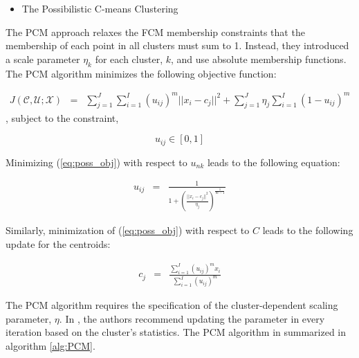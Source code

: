 \documentclass[12pt,dvips]{report}
\numberwithin{equation}{section}
\begin{document}
\begin{itemize}[leftmargin=12 pt]
\item The Possibilistic C-means Clustering
\end{itemize}

The PCM approach \cite{PCM} relaxes the FCM membership constraints that the membership of each point in all clusters must sum to 1.  Instead, they introduced a scale parameter $\eta_{k}$ for each cluster, $k$, and use absolute membership functions.  The PCM algorithm minimizes the following objective function:

\begin{eqnarray}  \label{eq:poss_obj}
J(\mathcal{C}, \mathcal{U};\mathcal{X})  & = & \sum_{j=1}^{J}\sum_{i=1}^{I} (u_{ij})^{m} \vert \vert x_{i}-c_{j}\vert \vert ^{2}+  \sum_{j=1}^{J}\eta_{j}\sum_{i=1}^{I}(1-u_{ij})^{m}
\end{eqnarray}, subject to the constraint,

\begin{equation} \label{eq:poss_con}
u_{ij}\in [0,1]
\end{equation}

Minimizing (\ref{eq:poss_obj}) with respect to $u_{nk}$ leads to the following equation:

\begin{eqnarray}  \label{eq:poss_optmu}
u_{ij}  & = & \frac{1}{1+(\frac{\vert \vert x_{i}-c_{j}\vert \vert ^{2}}{\eta_{j}})^{\frac{1}{m-1}}}
\end{eqnarray}

Similarly, minimization of (\ref{eq:poss_obj}) with respect to $C$ leads to the following update for the centroids:

\begin{eqnarray}  \label{eq:poss_optc}
c_{j}  & = & \frac{\sum_{i=1}^{I}(u_{ij})^{m}x_{i}}{\sum_{i=1}^{I}(u_{ij})^{m}}
\end{eqnarray}


The PCM algorithm requires the specification of the cluster-dependent scaling parameter, $\eta$.  In \cite{PCM}, the authors recommend updating the parameter in every iteration based on the cluster's statistics.  The PCM algorithm in summarized in algorithm \ref{alg:PCM}.  
\end{document}
